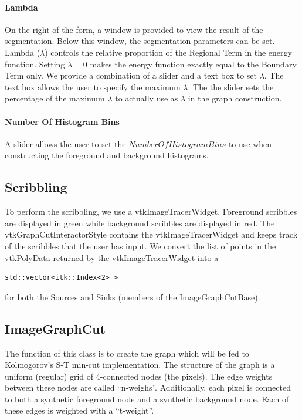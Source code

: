 \documentclass{InsightArticle}
\begin{document}
\paragraph{Lambda}
On the right of the form, a window is provided to view the result of the segmentation. Below this window, the segmentation parameters can be set. Lambda ($\lambda$) controls the relative proportion of the Regional Term in the energy function. Setting $\lambda = 0$ makes the energy function exactly equal to the Boundary Term only. We provide a combination of a slider and a text box to set $\lambda$. The text box allows the user to specify the maximum $\lambda$. The the slider sets the percentage of the maximum $\lambda$ to actually use as $\lambda$ in the graph construction.

\paragraph{Number Of Histogram Bins}
A slider allows the user to set the $NumberOfHistogramBins$ to use when constructing the foreground and background histograms.

\subsection{Scribbling}
To perform the scribbling, we use a vtkImageTracerWidget. Foreground scribbles are displayed in green while background scribbles are displayed in red. The vtkGraphCutInteractorStyle contains the vtkImageTracerWidget and keeps track of the scribbles that the user has input. We convert the list of points in the vtkPolyData returned by the vtkImageTracerWidget into a
\begin{verbatim}
std::vector<itk::Index<2> > 
\end{verbatim}

for both the Sources and Sinks (members of the ImageGraphCutBase).

\subsection{ImageGraphCut}
The function of this class is to create the graph which will be fed to Kolmogorov's S-T min-cut implementation. The structure of the graph is a uniform (regular) grid of 4-connected nodes (the pixels). The edge weights between these nodes are called ``n-weighs''.  Additionally, each pixel is connected to both a synthetic foreground node and a synthetic background node. Each of these edges is weighted with a ``t-weight''.
\end{document}
